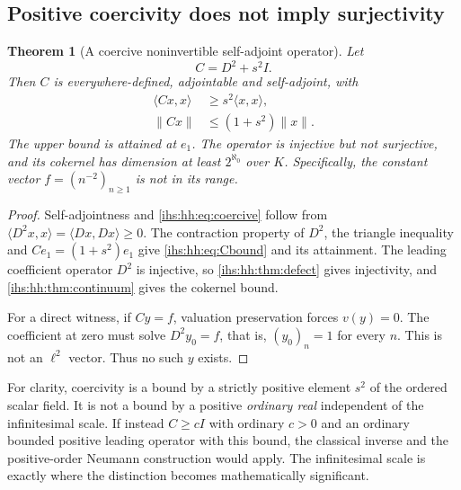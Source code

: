 \documentclass[11pt,a4paper]{article}
\numberwithin{equation}{section}
\newtheorem{theorem}{Theorem}[section]
\theoremstyle{definition}
\theoremstyle{remark}
\newcommand{\K}{K}
\newcommand{\norm}[1]{\lVert#1\rVert}
\newcommand{\ip}[2]{\langle#1,#2\rangle}
\begin{document}
\subsection{Positive coercivity does not imply surjectivity}\label{ihs:hh:sec:coercivethm}
\begin{theorem}[A coercive noninvertible self-adjoint operator]\label{ihs:hh:thm:coercive}
Let
\begin{equation}\label{ihs:hh:eq:C}
 C=D^2+s^2I.
\end{equation}
Then $C$ is everywhere-defined, adjointable and self-adjoint, with
\begin{align}
 \ip{Cx}{x}&\ge s^2\ip{x}{x},\label{ihs:hh:eq:coercive}\\
 \norm{Cx}&\le(1+s^2)\norm{x}.\label{ihs:hh:eq:Cbound}
\end{align}
The upper bound is attained at $e_1$. The operator is injective but not
surjective, and its cokernel has dimension at least $2^{\aleph_0}$ over
$\K$. Specifically, the constant vector $f=(n^{-2})_{n\ge1}$ is not in its
range.
\end{theorem}
\begin{proof}
Self-adjointness and \eqref{ihs:hh:eq:coercive} follow from
$\ip{D^2x}{x}=\ip{Dx}{Dx}\ge0$. The contraction property of $D^2$, the
triangle inequality and $Ce_1=(1+s^2)e_1$ give \eqref{ihs:hh:eq:Cbound} and
its attainment. The leading coefficient operator $D^2$ is injective, so
\cref{ihs:hh:thm:defect} gives injectivity, and
\cref{ihs:hh:thm:continuum} gives the cokernel bound.

For a direct witness, if $Cy=f$, valuation preservation forces $v(y)=0$. The
coefficient at zero must solve $D^2y_0=f$, that is, $(y_0)_n=1$ for every
$n$. This is not an $\ell^2$ vector. Thus no such $y$ exists.
\end{proof}

For clarity, coercivity is a bound by a strictly positive element $s^2$ of
the ordered scalar field. It is not a bound by a positive \emph{ordinary
real} independent of the infinitesimal scale. If instead $C\ge cI$ with
ordinary $c>0$ and an ordinary bounded positive leading operator with this
bound, the classical inverse and the positive-order Neumann construction
would apply. The infinitesimal scale is exactly where the distinction
becomes mathematically significant.
\end{document}
